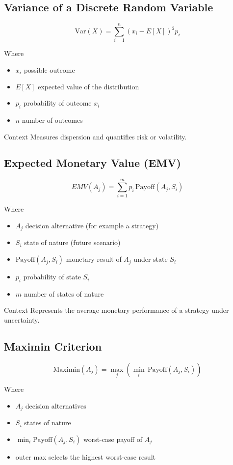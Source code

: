 	\subsection{Variance of a Discrete Random Variable}\label{formula-variance}
	
	\[
	\mathrm{Var}(X) = \sum_{i=1}^{n} (x_i - E[X])^2 p_i
	\]
	
	Where
	\begin{itemize}
		\item \(x_i\) possible outcome
		\item \(E[X]\) expected value of the distribution
		\item \(p_i\) probability of outcome \(x_i\)
		\item \(n\) number of outcomes
	\end{itemize}
	
	Context
	Measures dispersion and quantifies risk or volatility.
	
	\subsection{Expected Monetary Value (EMV)}\label{formula-emv}
	
	\[
	EMV(A_j) = \sum_{i=1}^{m} p_i \,\text{Payoff}(A_j,S_i)
	\]
	
	Where
	\begin{itemize}
		\item \(A_j\) decision alternative (for example a strategy)
		\item \(S_i\) state of nature (future scenario)
		\item \(\text{Payoff}(A_j,S_i)\) monetary result of \(A_j\) under state \(S_i\)
		\item \(p_i\) probability of state \(S_i\)
		\item \(m\) number of states of nature
	\end{itemize}
	
	Context
	Represents the average monetary performance of a strategy under uncertainty.
	
	\subsection{Maximin Criterion}\label{formula-maximin}
	
	\[
	\text{Maximin}(A_j) = \max_j \left( \min_i \,\text{Payoff}(A_j,S_i) \right)
	\]
	
	Where
	\begin{itemize}
		\item \(A_j\) decision alternatives
		\item \(S_i\) states of nature
		\item \(\min_i \text{Payoff}(A_j,S_i)\) worst-case payoff of \(A_j\)
		\item outer max selects the highest worst-case result
	\end{itemize}
	
